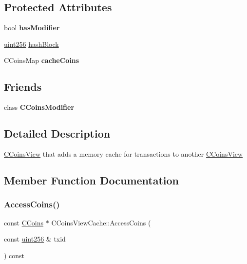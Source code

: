 \subsection*{Protected Attributes}
\begin{DoxyCompactItemize}
\item 
\mbox{\label{class_c_coins_view_cache_a363e27234d36bb0fc533d60cd64d1bc3}} 
bool {\bfseries has\+Modifier}
\item 
\mbox{\hyperlink{classuint256}{uint256}} \mbox{\hyperlink{class_c_coins_view_cache_a229dddddbc5501edc250209a2ce5df8b}{hash\+Block}}
\item 
\mbox{\label{class_c_coins_view_cache_af33cc2c6d38af65ac833d4d13c8e3764}} 
C\+Coins\+Map {\bfseries cache\+Coins}
\end{DoxyCompactItemize}
\subsection*{Friends}
\begin{DoxyCompactItemize}
\item 
\mbox{\label{class_c_coins_view_cache_ae6ce8219acb79950bced74cb108acacf}} 
class {\bfseries C\+Coins\+Modifier}
\end{DoxyCompactItemize}


\subsection{Detailed Description}
\mbox{\hyperlink{class_c_coins_view}{C\+Coins\+View}} that adds a memory cache for transactions to another \mbox{\hyperlink{class_c_coins_view}{C\+Coins\+View}} 

\subsection{Member Function Documentation}
\mbox{\label{class_c_coins_view_cache_a8e5341e8b01233949d6170dd4d1fd75d}} 
\subsubsection{\texorpdfstring{Access\+Coins()}{AccessCoins()}}
{\footnotesize\ttfamily const \mbox{\hyperlink{class_c_coins}{C\+Coins}} $\ast$ C\+Coins\+View\+Cache\+::\+Access\+Coins (\begin{DoxyParamCaption}\item[{const \mbox{\hyperlink{classuint256}{uint256}} \&}]{txid }\end{DoxyParamCaption}) const}

